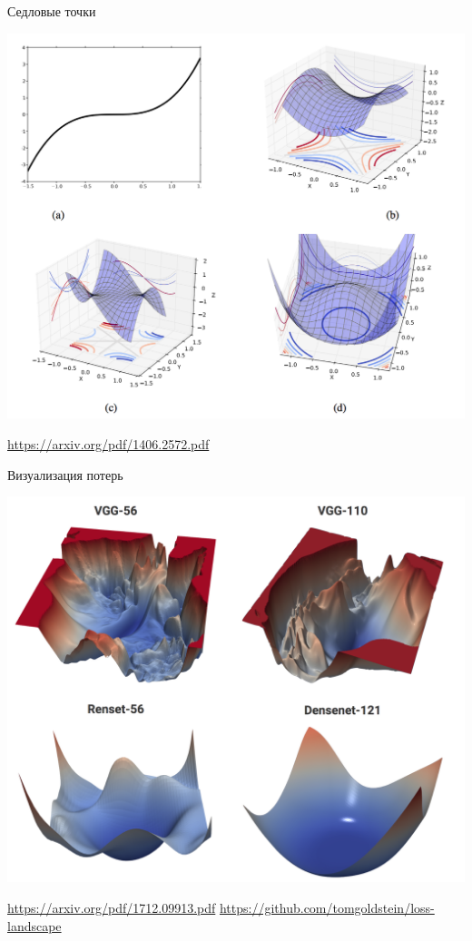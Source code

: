 \documentclass[notes,12pt, aspectratio=169]{beamer}
\begin{document}
\begin{frame}{Седловые точки}
	\begin{center}
		\includegraphics[width=0.5\paperwidth]{sedlo.png}
	\end{center}
	\vfill %
	\footnotesize 
	\color{blue} \url{https://arxiv.org/pdf/1406.2572.pdf}
\end{frame}


\begin{frame}{Визуализация потерь}
	\begin{center}
		\includegraphics[width=0.5\paperwidth]{loss.png}
	\end{center}
	\vfill %
	\footnotesize 
	\color{blue} \url{https://arxiv.org/pdf/1712.09913.pdf} \newline  \url{https://github.com/tomgoldstein/loss-landscape}
\end{frame}
\end{document}
